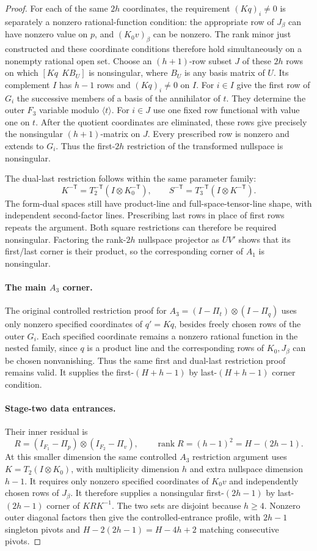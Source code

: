 \begin{proof}
For each of the same $2h$ coordinates, the requirement $(Kq)_i\ne0$
is separately a nonzero rational-function condition: the appropriate
row of $J_\beta$ can have nonzero value on $p$, and
$(K_0v)_\beta$ can be nonzero. The rank minor just constructed and these
coordinate conditions therefore hold simultaneously on a nonempty
rational open set. Choose an $(h+1)$-row subset $J$ of these $2h$ rows
on which $[Kq\ \ KB_U]$ is nonsingular, where $B_U$ is any basis matrix
of $U$. Its complement $I$ has $h-1$ rows and $(Kq)_i\ne0$ on $I$.
For $i\in I$ give the first row of $G_i$ the successive members of a
basis of the annihilator of $t$. They determine the outer $F_3$ variable
modulo $\langle t\rangle$. For $i\in J$ use one fixed row functional
with value one on $t$. After the quotient coordinates are eliminated,
these rows give precisely the nonsingular $(h+1)$-matrix on $J$.
Every prescribed row is nonzero and extends to $G_i$. Thus the
first-$2h$ restriction of the transformed nullspace is nonsingular.

The dual-last restriction follows within the same parameter family:
\[
 K^{-\mathsf T}=T_2^{-\mathsf T}(I\otimes K_0^{-\mathsf T}),\qquad
 S^{-\mathsf T}=T_3^{-\mathsf T}(I\otimes K^{-\mathsf T}).
\]
The form-dual spaces still have product-line and full-space-tensor-line
shape, with independent second-factor lines. Prescribing last rows in
place of first rows repeats the argument. Both square restrictions can
therefore be required nonsingular. Factoring the rank-$2h$ nullspace
projector as $UV'$ shows that its first/last corner is their product,
so the corresponding corner of $A_1$ is nonsingular.

\paragraph{The main $A_3$ corner.}
The original controlled restriction proof for
$A_3=(I-\Pi_t)\otimes(I-\Pi_q)$ uses only nonzero specified coordinates
of $q'=Kq$, besides freely chosen rows of the outer $G_i$.
Each specified coordinate remains a nonzero rational function in the
nested family, since $q$ is a product line and the corresponding rows of
$K_0,J_\beta$ can be chosen nonvanishing. Thus the same first and dual-last
restriction proof remains valid. It supplies the first-$(H+h-1)$ by
last-$(H+h-1)$ corner condition.

\paragraph{Stage-two data entrances.}
Their inner residual is
\[
 R=(I_{F_1}-\Pi_p)\otimes(I_{F_2}-\Pi_v),
 \qquad \operatorname{rank}R=(h-1)^2=H-(2h-1).
\]
At this smaller dimension the same controlled $A_3$ restriction argument
uses $K=T_2(I\otimes K_0)$, with multiplicity dimension $h$ and extra
nullspace dimension $h-1$. It requires only nonzero specified coordinates
of $K_0v$ and independently chosen rows of $J_\beta$. It therefore
supplies a nonsingular first-$(2h-1)$ by last-$(2h-1)$ corner of $KRK^{-1}$.
The two sets are disjoint because $h\ge4$. Nonzero outer diagonal factors
then give the controlled-entrance profile, with $2h-1$ singleton pivots
and $H-2(2h-1)=H-4h+2$ matching consecutive pivots.


\end{proof}
